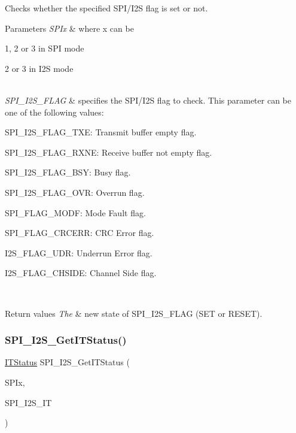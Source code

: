 Checks whether the specified S\+P\+I/\+I2S flag is set or not. 


\begin{DoxyParams}{Parameters}
{\em S\+P\+Ix} & where x can be
\begin{DoxyItemize}
\item 1, 2 or 3 in S\+PI mode
\item 2 or 3 in I2S mode 
\end{DoxyItemize}\\
\hline
{\em S\+P\+I\+\_\+\+I2\+S\+\_\+\+F\+L\+AG} & specifies the S\+P\+I/\+I2S flag to check. This parameter can be one of the following values\+: \begin{DoxyItemize}
\item S\+P\+I\+\_\+\+I2\+S\+\_\+\+F\+L\+A\+G\+\_\+\+T\+XE\+: Transmit buffer empty flag. \item S\+P\+I\+\_\+\+I2\+S\+\_\+\+F\+L\+A\+G\+\_\+\+R\+X\+NE\+: Receive buffer not empty flag. \item S\+P\+I\+\_\+\+I2\+S\+\_\+\+F\+L\+A\+G\+\_\+\+B\+SY\+: Busy flag. \item S\+P\+I\+\_\+\+I2\+S\+\_\+\+F\+L\+A\+G\+\_\+\+O\+VR\+: Overrun flag. \item S\+P\+I\+\_\+\+F\+L\+A\+G\+\_\+\+M\+O\+DF\+: Mode Fault flag. \item S\+P\+I\+\_\+\+F\+L\+A\+G\+\_\+\+C\+R\+C\+E\+RR\+: C\+RC Error flag. \item I2\+S\+\_\+\+F\+L\+A\+G\+\_\+\+U\+DR\+: Underrun Error flag. \item I2\+S\+\_\+\+F\+L\+A\+G\+\_\+\+C\+H\+S\+I\+DE\+: Channel Side flag. \end{DoxyItemize}
\\
\hline
\end{DoxyParams}

\begin{DoxyRetVals}{Return values}
{\em The} & new state of S\+P\+I\+\_\+\+I2\+S\+\_\+\+F\+L\+AG (S\+ET or R\+E\+S\+ET). \\
\hline
\end{DoxyRetVals}
\mbox{\label{group___s_p_i___private___functions_ga72decbc1cd79f8fad92a2204beca6bc5}} 
\subsubsection{\texorpdfstring{SPI\_I2S\_GetITStatus()}{SPI\_I2S\_GetITStatus()}}
{\footnotesize\ttfamily \mbox{\hyperlink{group___exported__types_gaacbd7ed539db0aacd973a0f6eca34074}{I\+T\+Status}} S\+P\+I\+\_\+\+I2\+S\+\_\+\+Get\+I\+T\+Status (\begin{DoxyParamCaption}\item[{\mbox{\hyperlink{struct_s_p_i___type_def}{S\+P\+I\+\_\+\+Type\+Def}} $\ast$}]{S\+P\+Ix,  }\item[{uint8\+\_\+t}]{S\+P\+I\+\_\+\+I2\+S\+\_\+\+IT }\end{DoxyParamCaption})}



